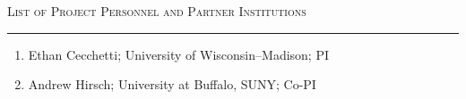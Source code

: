 



\begin{center}
{\LARGE
\textsc{List of Project Personnel and Partner Institutions}
}
\end{center}
\hrule

\begin{enumerate}
  \item Ethan Cecchetti; University of Wisconsin--Madison; PI
  \item Andrew Hirsch; University at Buffalo, SUNY; Co-PI
\end{enumerate}

\vspace{3mm}


